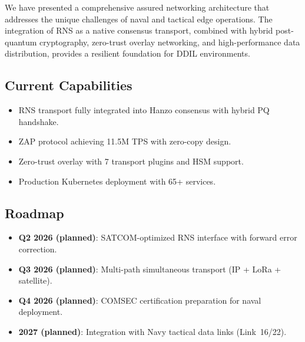 \documentclass[11pt,letterpaper]{article}
\begin{document}
We have presented a comprehensive assured networking architecture that addresses the unique challenges of naval and tactical edge operations. The integration of RNS as a native consensus transport, combined with hybrid post-quantum cryptography, zero-trust overlay networking, and high-performance data distribution, provides a resilient foundation for DDIL environments.

\subsection{Current Capabilities}

\begin{itemize}
\item RNS transport fully integrated into Hanzo consensus with hybrid PQ handshake.
\item ZAP protocol achieving 11.5M TPS with zero-copy design.
\item Zero-trust overlay with 7 transport plugins and HSM support.
\item Production Kubernetes deployment with 65+ services.
\end{itemize}

\subsection{Roadmap}

\begin{itemize}
\item \textbf{Q2 2026 (planned)}: SATCOM-optimized RNS interface with forward error correction.
\item \textbf{Q3 2026 (planned)}: Multi-path simultaneous transport (IP + LoRa + satellite).
\item \textbf{Q4 2026 (planned)}: COMSEC certification preparation for naval deployment.
\item \textbf{2027 (planned)}: Integration with Navy tactical data links (Link~16/22).
\end{itemize}
\end{document}
